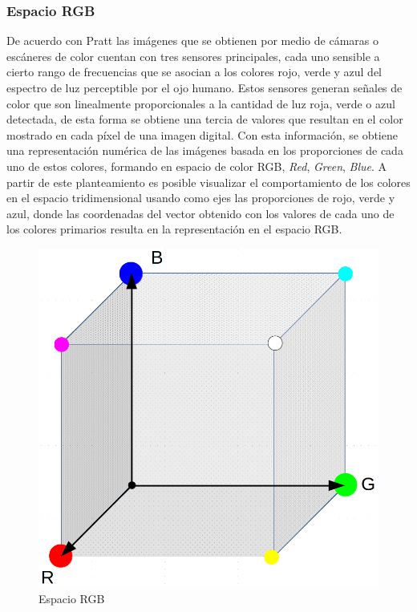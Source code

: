 \subsubsection{Espacio RGB}
De acuerdo con Pratt \cite{pratt_introduction_2014} las imágenes que se obtienen por medio de cámaras o escáneres de color cuentan con tres sensores principales, cada uno sensible a cierto rango de frecuencias que se asocian a los colores rojo, verde y azul del espectro de luz perceptible por el ojo humano. Estos sensores generan señales de color que son linealmente proporcionales a la cantidad de luz roja, verde o azul  detectada, de esta forma se obtiene una tercia de valores que resultan en el color mostrado en cada píxel de una imagen digital. Con esta información, se obtiene una representación numérica de las imágenes basada en los proporciones de cada uno de estos colores, formando en espacio de color RGB, \textit{Red}, \textit{Green}, \textit{Blue}. A partir de este planteamiento es posible visualizar el comportamiento de los colores en el espacio tridimensional usando como ejes las proporciones de rojo, verde y azul, donde las coordenadas del vector obtenido con los valores de cada uno de los colores primarios resulta en la representación en el espacio RGB.

\begin{figure}[H]
\centering
\includegraphics[scale=0.2]{Figures/CuboRGB.png}
    \caption{Espacio RGB}
    \label{fig:RGB_Space}
\end{figure}

